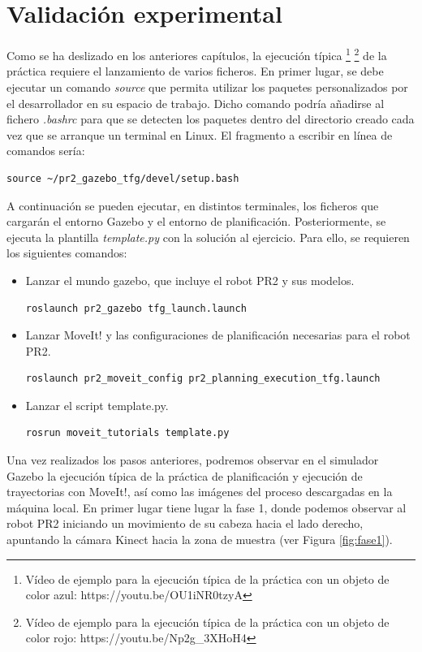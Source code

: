 \documentclass[12pt,spanish,chapterprefix, numbers=noenddot]{book}
\numberwithin{equation}{section}
\numberwithin{figure}{section}
\begin{document}
\section{Validación experimental}
Como se ha deslizado en los anteriores capítulos, la ejecución típica \footnote{Vídeo de ejemplo para la ejecución típica de la práctica con un objeto de color azul: https://youtu.be/OU1iNR0tzyA} \footnote{Vídeo de ejemplo para la ejecución típica de la práctica con un objeto de color rojo: https://youtu.be/Np2g\_3XHoH4} de la práctica requiere el lanzamiento de varios ficheros. En primer lugar, se debe ejecutar un comando \textit{source} que permita utilizar los paquetes personalizados por el desarrollador en su espacio de trabajo. Dicho comando podría añadirse al fichero \textit{.bashrc} para que se detecten los paquetes dentro del directorio creado cada vez que se arranque un terminal en Linux. El fragmento a escribir en línea de comandos sería: 
	\begin{lstlisting}[frame=single]
source ~/pr2_gazebo_tfg/devel/setup.bash
    \end{lstlisting}
    
A continuación se pueden ejecutar, en distintos terminales, los ficheros que cargarán el entorno Gazebo y el entorno de planificación. Posteriormente, se ejecuta la plantilla \textit{template.py} con la solución al ejercicio. Para ello, se requieren los siguientes comandos: 
\begin{itemize}
    \item Lanzar el mundo gazebo, que incluye el robot PR2 y sus modelos.
	\begin{lstlisting}[frame=single]
roslaunch pr2_gazebo tfg_launch.launch
    \end{lstlisting}
    \item Lanzar MoveIt! y las configuraciones de planificación necesarias para el robot PR2.
	\begin{lstlisting}[frame=single]
roslaunch pr2_moveit_config pr2_planning_execution_tfg.launch
    \end{lstlisting}
    \item Lanzar el script template.py.
	\begin{lstlisting}[frame=single]
rosrun moveit_tutorials template.py
    \end{lstlisting}
\end{itemize}
Una vez realizados los pasos anteriores, podremos observar en el simulador Gazebo la ejecución típica de la práctica de planificación y ejecución de trayectorias con MoveIt!, así como las imágenes del proceso descargadas en la máquina local. 
En primer lugar tiene lugar la fase 1, donde podemos observar al robot PR2 iniciando un movimiento de su cabeza hacia el lado derecho, apuntando la cámara Kinect hacia la zona de muestra (ver Figura \ref{fig:fase1}).
\end{document}
